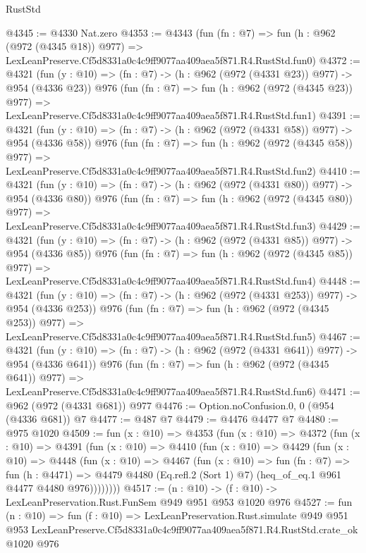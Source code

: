 \begin{lexlean}{RustStd}
\begin{coremodule}
@4345 := @4330 Nat.zero
@4353 := @4343
    (fun (fn : @7) =>
    fun (h : @962 (@972 (@4345 @18)) @977) =>
    LexLeanPreserve.Cf5d8331a0c4c9ff9077aa409aea5f871.R4.RustStd.fun0)
@4372 := @4321
    (fun (y : @10) => (fn : @7) -> (h : @962 (@972 (@4331 @23)) @977) -> @954 (@4336 @23))
    @976
    (fun (fn : @7) =>
    fun (h : @962 (@972 (@4345 @23)) @977) =>
    LexLeanPreserve.Cf5d8331a0c4c9ff9077aa409aea5f871.R4.RustStd.fun1)
@4391 := @4321
    (fun (y : @10) => (fn : @7) -> (h : @962 (@972 (@4331 @58)) @977) -> @954 (@4336 @58))
    @976
    (fun (fn : @7) =>
    fun (h : @962 (@972 (@4345 @58)) @977) =>
    LexLeanPreserve.Cf5d8331a0c4c9ff9077aa409aea5f871.R4.RustStd.fun2)
@4410 := @4321
    (fun (y : @10) => (fn : @7) -> (h : @962 (@972 (@4331 @80)) @977) -> @954 (@4336 @80))
    @976
    (fun (fn : @7) =>
    fun (h : @962 (@972 (@4345 @80)) @977) =>
    LexLeanPreserve.Cf5d8331a0c4c9ff9077aa409aea5f871.R4.RustStd.fun3)
@4429 := @4321
    (fun (y : @10) => (fn : @7) -> (h : @962 (@972 (@4331 @85)) @977) -> @954 (@4336 @85))
    @976
    (fun (fn : @7) =>
    fun (h : @962 (@972 (@4345 @85)) @977) =>
    LexLeanPreserve.Cf5d8331a0c4c9ff9077aa409aea5f871.R4.RustStd.fun4)
@4448 := @4321
    (fun (y : @10) => (fn : @7) -> (h : @962 (@972 (@4331 @253)) @977) -> @954 (@4336 @253))
    @976
    (fun (fn : @7) =>
    fun (h : @962 (@972 (@4345 @253)) @977) =>
    LexLeanPreserve.Cf5d8331a0c4c9ff9077aa409aea5f871.R4.RustStd.fun5)
@4467 := @4321
    (fun (y : @10) => (fn : @7) -> (h : @962 (@972 (@4331 @641)) @977) -> @954 (@4336 @641))
    @976
    (fun (fn : @7) =>
    fun (h : @962 (@972 (@4345 @641)) @977) =>
    LexLeanPreserve.Cf5d8331a0c4c9ff9077aa409aea5f871.R4.RustStd.fun6)
@4471 := @962 (@972 (@4331 @681)) @977
@4476 := Option.noConfusion.{0, 0} (@954 (@4336 @681)) @7
@4477 := @487 @7
@4479 := @4476 @4477 @7
@4480 := @975 @1020
@4509 := fun (x : @10) =>
  @4353
    (fun (x : @10) =>
    @4372
      (fun (x : @10) =>
      @4391
        (fun (x : @10) =>
        @4410
          (fun (x : @10) =>
          @4429
            (fun (x : @10) =>
            @4448
              (fun (x : @10) =>
              @4467
                (fun (x : @10) =>
                fun (fn : @7) =>
                fun (h : @4471) =>
                @4479 @4480 (Eq.refl.{2} (Sort 1) @7) (heq_of_eq.{1} @961 @4477 @4480 @976))))))))
@4517 := (n : @10) -> (f : @10) -> LexLeanPreservation.Rust.FunSem @949 @951 @953 @1020 @976
@4527 := fun (n : @10) =>
  fun (f : @10) =>
  LexLeanPreservation.Rust.simulate
    @949
    @951
    @953
    LexLeanPreserve.Cf5d8331a0c4c9ff9077aa409aea5f871.R4.RustStd.crate_ok
    @1020
    @976
\end{coremodule}
\end{lexlean}

